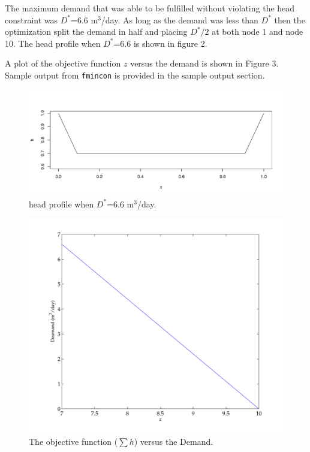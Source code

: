 \documentclass[12pt,twoside]{article}
\begin{document}
The maximum demand that was able to be fulfilled without violating the head constraint was $D^*$=6.6 m$^3$/day. As long as the demand was less than $D^*$ then the optimization split the demand in half and placing $D^*/2$ at both node 1 and node 10.  The head profile when $D^*$=6.6 is shown in figure 2.  

A plot of the objective function $z$ versus the demand is shown in Figure 3.  Sample output from \verb"fmincon" is provided in the sample output section.



\begin{figure}[!h] %
   \centering
   \includegraphics[width=\textwidth]{figs/head.pdf} 
   \caption{head profile when $D^*$=6.6 m$^3$/day.}
   \label{fig:head}
\end{figure}

\begin{figure}[!h] %
   \centering
   \includegraphics[width=6in]{figs/zvd} 
   \caption{The objective function ($\sum h$) versus the Demand.}
   \label{fig:zvd}
\end{figure}
\end{document}
